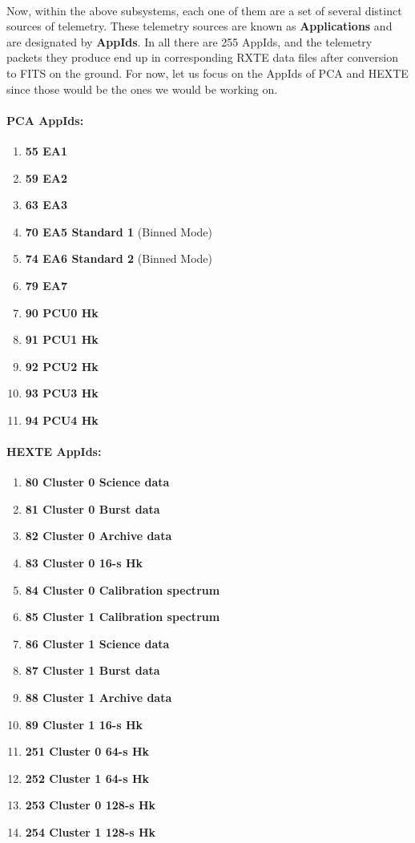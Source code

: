 \documentclass[a4paper,twoside]{report}
\numberwithin{equation}{section}
\begin{document}
\paragraph{}
Now, within the above subsystems, each one of them are a set of several distinct sources of telemetry. These telemetry sources are known as \textbf{Applications} and are designated by \textbf{AppIds}. In all there are 255 AppIds, and the telemetry packets they produce end up in corresponding RXTE data files after conversion to FITS on the ground. For now, let us focus on the AppIds of PCA and HEXTE since those would be the ones we would be working on. 
\paragraph{PCA AppIds:}
\begin{enumerate}
\item \textbf{55 EA1}
\item \textbf{59 EA2}
\item \textbf{63 EA3} 
\item \textbf{70 EA5 Standard 1} (Binned Mode)
\item \textbf{74 EA6 Standard 2} (Binned Mode)
\item \textbf{79 EA7}
\item \textbf{90 PCU0 Hk}
\item \textbf{91 PCU1 Hk}
\item \textbf{92 PCU2 Hk}
\item \textbf{93 PCU3 Hk}
\item \textbf{94 PCU4 Hk}
\end{enumerate}
\paragraph{HEXTE AppIds:}
\begin{enumerate}
\item \textbf{80 Cluster 0 Science data}
\item \textbf{81  Cluster 0 Burst data}
\item \textbf{82  Cluster 0 Archive data}
\item \textbf{83  Cluster 0 16-s Hk}
\item \textbf{84  Cluster 0 Calibration spectrum}
\item \textbf{85  Cluster 1 Calibration spectrum}
\item \textbf{86  Cluster 1 Science data}
\item \textbf{87  Cluster 1 Burst data}
\item \textbf{88  Cluster 1 Archive data}
\item \textbf{89  Cluster 1 16-s Hk}
\item \textbf{251  Cluster 0 64-s Hk}
\item \textbf{252  Cluster 1 64-s Hk}
\item \textbf{253  Cluster 0 128-s Hk}
\item \textbf{254  Cluster 1 128-s Hk}
\end{enumerate}
\end{document}

